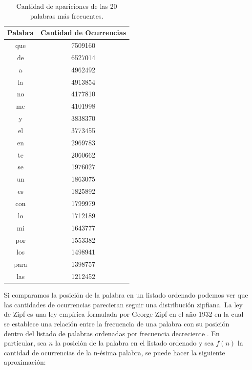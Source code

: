 \begin{table}[ht]
\centering
\label{tab:palabrasMasOcurrentes}
\begin{tabular}{ c c }
\toprule
Palabra & Cantidad de Ocurrencias \\ 
\midrule
que     & 7509160                 \\
de      & 6527014                 \\
a       & 4962492                 \\
la      & 4913854                 \\
no      & 4177810                 \\
me      & 4101998                 \\
y       & 3838370                 \\
el      & 3773455                 \\
en      & 2969783                 \\
te      & 2060662                 \\
se      & 1976027                 \\
un      & 1863075                 \\
es      & 1825892                 \\
con     & 1799979                 \\
lo      & 1712189                 \\
mi      & 1643777                 \\
por     & 1553382                 \\
los     & 1498941                 \\
para    & 1398757                 \\
las     & 1212452                 \\
\bottomrule
\end{tabular}
\caption{Cantidad de apariciones de las 20 palabras más frecuentes.}

\end{table}

Si comparamos la posición de la palabra en un listado ordenado podemos ver que  las cantidades de ocurrencias parecieran seguir una distribución zipfiana. La ley de Zipf es una ley empírica formulada por George Zipf en el año 1932 en la cual se establece una relación entre la frecuencia de una palabra con su posición dentro del listado de palabras ordenadas por frecuencia decreciente \cite{montemurro2001beyond,zipf2016human}. En particular, sea $n$ la posición de la palabra en el listado ordenado y sea $f(n)$ la cantidad de ocurrencias de la n-ésima palabra, se puede hacer la siguiente aproximación:

